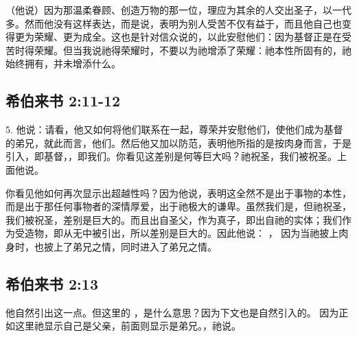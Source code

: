（他说）因为那温柔眷顾、创造万物的那一位，理应为其余的人交出圣子，以一代多。然而他没有这样表达，而是说，表明为别人受苦不仅有益于，而且他自己也变得更为荣耀、更为成全。这也是针对信众说的，以此安慰他们：因为基督正是在受苦时得荣耀。但当我说祂得荣耀时，不要以为祂增添了荣耀：祂本性所固有的，祂始终拥有，并未增添什么。\par


\subsection{希伯来书 2:11-12}

5. 他说：请看，他又如何将他们联系在一起，尊荣并安慰他们，使他们成为基督的弟兄，就此而言，他们。然后他又加以防范，表明他所指的是按肉身而言，于是引入，即基督，，即我们。你看见这差别是何等巨大吗？祂祝圣，我们被祝圣。上面他说。 \par

你看见他如何再次显示出超越性吗？因为他说，表明这全然不是出于事物的本性，而是出于那任何事物者的深情厚爱，出于祂极大的谦卑。虽然我们是，但祂祝圣，我们被祝圣，差别是巨大的。而且出自圣父，作为真子，即出自祂的实体；我们作为受造物，即从无中被引出，所以差别是巨大的。因此他说： ，  因为当祂披上肉身时，也披上了弟兄之情，同时进入了弟兄之情。\par


\subsection{希伯来书 2:13}

他自然引出这一点。但这里的 ，是什么意思？因为下文也是自然引入的。  因为正如这里祂显示自己是父亲，前面则显示是弟兄。，祂说。\par

